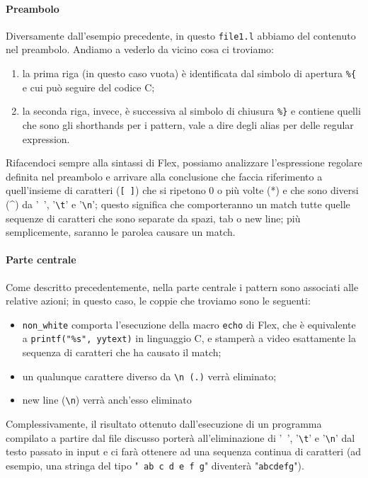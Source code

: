 \documentclass[class=book, crop=false, oneside, 12pt]{standalone}
\begin{document}
\paragraph{Preambolo}
Diversamente dall'esempio precedente, in questo \texttt{file1.l} abbiamo del contenuto nel preambolo. Andiamo a vederlo da vicino cosa ci troviamo:

\begin{enumerate}
    \item la prima riga (in questo caso vuota) è identificata dal simbolo di apertura \texttt{\%\{} e cui può seguire del codice C;
    \item la seconda riga, invece, è successiva al simbolo di chiusura \texttt{\%\}} e contiene quelli che sono gli shorthands per i pattern, vale a dire degli alias per delle regular expression.
\end{enumerate}

Rifacendoci sempre alla sintassi di Flex, possiamo analizzare l'espressione regolare definita nel preambolo e arrivare alla conclusione che faccia riferimento a quell'insieme di caratteri (\texttt{[ ]}) che si ripetono \(0\) o più volte (*) e che sono diversi (\^{}) da '\texttt{ }', '\texttt{\textbackslash t}' e '\texttt{\textbackslash n}'; questo significa che comporteranno un match tutte quelle sequenze di caratteri che sono separate da spazi, tab o new line; più semplicemente, saranno le parolea causare un match.

\paragraph{Parte centrale}
Come descritto precedentemente, nella parte centrale i pattern sono associati alle relative azioni; in questo caso, le coppie che troviamo sono le seguenti:
\begin{itemize}
    \item \texttt{non\_white} comporta l'esecuzione della macro \texttt{echo} di Flex, che è equivalente a \texttt{printf("\%s", yytext)} in linguaggio C, e stamperà a video esattamente la sequenza di caratteri che ha causato il match;
    \item un qualunque carattere diverso da \texttt{\textbackslash n (.)} verrà eliminato;
    \item new line (\texttt{\textbackslash n}) verrà anch'esso eliminato
\end{itemize}

Complessivamente, il risultato ottenuto dall'esecuzione di un programma compilato a partire dal file discusso porterà all'eliminazione di '\texttt{ }', '\texttt{\textbackslash t}' e '\texttt{\textbackslash n}' dal testo passato in input e ci farà ottenere ad una sequenza continua di caratteri (ad esempio, una stringa del tipo "\texttt{ ab c d e \hspace{.8cm} f g}" diventerà "\texttt{abcdefg}").
\end{document}
